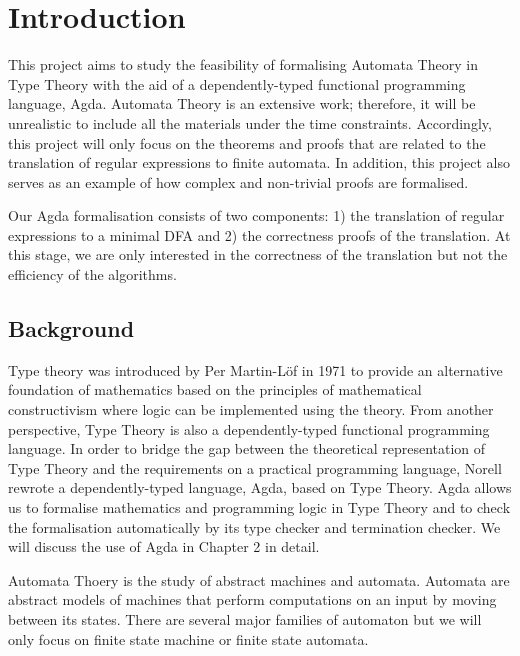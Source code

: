 \chapter{Introduction}
\par This project aims to study the feasibility of formalising
Automata Theory \cite{aho1972} in Type Theory
\cite{martin1984} with the aid of a dependently-typed functional
programming language, Agda. Automata Theory is an extensive work;
therefore, it will be unrealistic to
include all the materials under the time constraints. Accordingly,
this project will only focus on the theorems and
proofs that are related to the translation of regular expressions
to finite automata. In addition, this project also serves as an
example of how complex and non-trivial proofs are formalised. 

\par Our Agda formalisation consists of two components: 1) the
translation of regular expressions to a minimal DFA and 2)
the correctness proofs of the translation. At this stage, we are only
interested in the correctness of the translation but not the
efficiency of the algorithms. 


\section{Background}
\par Type theory was introduced by Per Martin-L{\"o}f in
1971 to provide an alternative foundation of mathematics based on the
principles of mathematical constructivism where logic can be
implemented using the theory. From another perspective, Type Theory is also a
dependently-typed functional programming language. In order to bridge the gap between
the theoretical representation of Type Theory and the requirements on
a practical programming language, Norell \cite{norell2007} rewrote a
dependently-typed language, Agda, based on Type Theory. Agda allows us
to formalise mathematics and programming logic in Type Theory and to 
check the formalisation automatically by its type checker and termination
checker. We will discuss the use of Agda in Chapter 2 in detail. 

\par Automata Thoery is the study of abstract machines and
automata. Automata are abstract models of machines that perform
computations on an input by moving between its states. There
are several major families of automaton but we will
only focus on finite state machine or finite state automata. 


